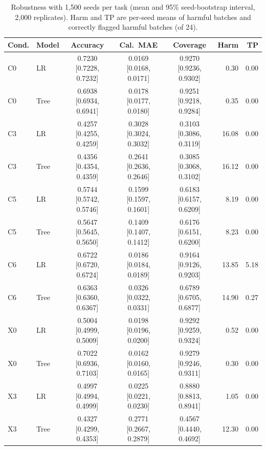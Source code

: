 \begin{table}[t]
\centering
\caption{Robustness with 1,500 seeds per task (mean and 95\% seed-bootstrap interval, 2,000 replicates). Harm and TP are per-seed means of harmful batches and correctly flagged harmful batches (of 24).}
\label{tab:largeseed}
\setlength{\tabcolsep}{6pt}
\small
\begin{tabular}{llcccrr}
\toprule
Cond. & Model & Accuracy & Cal.\ MAE & Coverage & Harm & TP \\
\midrule
C0 & LR & 0.7230 {\scriptsize[0.7228, 0.7232]} & 0.0169 {\scriptsize[0.0168, 0.0171]} & 0.9270 {\scriptsize[0.9236, 0.9302]} & 0.30 & 0.00 \\
C0 & Tree & 0.6938 {\scriptsize[0.6934, 0.6941]} & 0.0178 {\scriptsize[0.0177, 0.0180]} & 0.9251 {\scriptsize[0.9218, 0.9284]} & 0.35 & 0.00 \\
C3 & LR & 0.4257 {\scriptsize[0.4255, 0.4259]} & 0.3028 {\scriptsize[0.3024, 0.3032]} & 0.3103 {\scriptsize[0.3086, 0.3119]} & 16.08 & 0.00 \\
C3 & Tree & 0.4356 {\scriptsize[0.4354, 0.4359]} & 0.2641 {\scriptsize[0.2636, 0.2646]} & 0.3085 {\scriptsize[0.3068, 0.3102]} & 16.12 & 0.00 \\
C5 & LR & 0.5744 {\scriptsize[0.5742, 0.5746]} & 0.1599 {\scriptsize[0.1597, 0.1601]} & 0.6183 {\scriptsize[0.6157, 0.6209]} & 8.19 & 0.00 \\
C5 & Tree & 0.5647 {\scriptsize[0.5645, 0.5650]} & 0.1409 {\scriptsize[0.1407, 0.1412]} & 0.6176 {\scriptsize[0.6151, 0.6200]} & 8.23 & 0.00 \\
C6 & LR & 0.6722 {\scriptsize[0.6720, 0.6724]} & 0.0186 {\scriptsize[0.0184, 0.0189]} & 0.9164 {\scriptsize[0.9126, 0.9203]} & 13.85 & 5.18 \\
C6 & Tree & 0.6363 {\scriptsize[0.6360, 0.6367]} & 0.0326 {\scriptsize[0.0322, 0.0331]} & 0.6789 {\scriptsize[0.6705, 0.6877]} & 14.90 & 0.27 \\
X0 & LR & 0.5004 {\scriptsize[0.4999, 0.5009]} & 0.0198 {\scriptsize[0.0196, 0.0200]} & 0.9292 {\scriptsize[0.9259, 0.9324]} & 0.52 & 0.00 \\
X0 & Tree & 0.7022 {\scriptsize[0.6936, 0.7103]} & 0.0162 {\scriptsize[0.0160, 0.0165]} & 0.9279 {\scriptsize[0.9246, 0.9311]} & 0.30 & 0.00 \\
X3 & LR & 0.4997 {\scriptsize[0.4994, 0.4999]} & 0.0225 {\scriptsize[0.0221, 0.0230]} & 0.8880 {\scriptsize[0.8813, 0.8941]} & 1.05 & 0.00 \\
X3 & Tree & 0.4327 {\scriptsize[0.4299, 0.4353]} & 0.2771 {\scriptsize[0.2667, 0.2879]} & 0.4567 {\scriptsize[0.4440, 0.4692]} & 12.30 & 0.00 \\
\bottomrule
\end{tabular}
\end{table}
